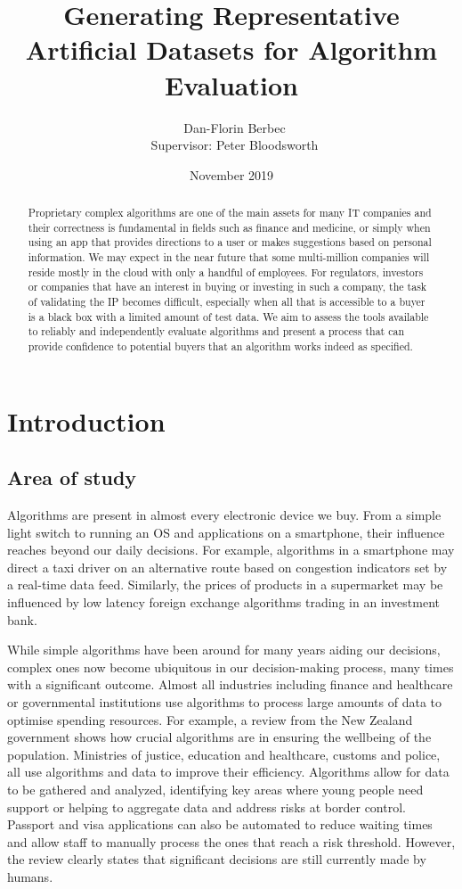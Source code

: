 \documentclass[proposal]{softeng}
\title{Generating Representative Artificial Datasets for Algorithm Evaluation}
\author{\ Dan-Florin Berbec \\ \ Supervisor: Peter Bloodsworth}
\date{November 2019}
\begin{document}
\maketitle

\newpage
\clearpage\mbox{}\clearpage

\begin{abstract}
Proprietary complex algorithms are one of the main assets for many IT companies and their correctness is fundamental in fields such as finance and medicine, or simply when using an app that provides directions to a user or makes suggestions based on personal information. We may expect in the near future that some multi-million companies will reside mostly in the cloud with only a handful of employees. For regulators, investors or companies that have an interest in buying or investing in such a company, the task of validating the IP becomes difficult, especially when all that is accessible to a buyer is a black box with a limited amount of test data. We aim to assess the tools available to reliably and independently evaluate algorithms and present a process that can provide confidence to potential buyers that an algorithm works indeed as specified.\end{abstract}
 
\section{Introduction}
\subsection{Area of study}

Algorithms are present in almost every electronic device we buy. From a simple light switch to running an OS and applications on a smartphone, their influence reaches beyond our daily decisions. For example, algorithms in a smartphone may direct a taxi driver on an alternative route based on congestion indicators set by a real-time data feed. Similarly, the prices of products in a supermarket may be influenced by low latency foreign exchange algorithms trading in an investment bank.

While simple algorithms have been around for many years aiding our decisions, complex ones now become ubiquitous in our decision-making process, many times with a significant outcome. Almost all industries including finance and healthcare or governmental institutions use algorithms to process large amounts of data to optimise spending resources. For example, a review\cite{algassessment} from the New Zealand government shows how crucial algorithms are in ensuring the wellbeing of the population. Ministries of justice, education and healthcare, customs and police, all use algorithms and data to improve their efficiency. Algorithms allow for data to be gathered and analyzed, identifying key areas where young people need support or helping to aggregate data and address risks at border control. Passport and visa applications can also be automated to reduce waiting times and allow staff to manually process the ones that reach a risk threshold. However, the review clearly states that significant decisions are still currently made by humans. 
\end{document}
